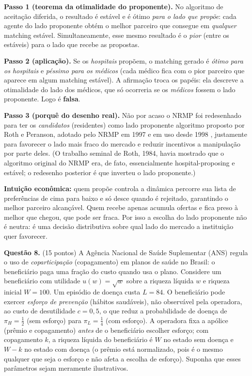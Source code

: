 \begin{solucao}
\textbf{Passo 1 (teorema da otimalidade do proponente).} No algoritmo de aceita\c{c}\~ao diferida, o resultado \'e est\'avel e \'e \'otimo \emph{para o lado que prop\~oe}: cada agente do lado proponente obt\'em o melhor parceiro que consegue em \emph{qualquer} matching est\'avel. Simultaneamente, esse mesmo resultado \'e o \emph{pior} (entre os est\'aveis) para o lado que recebe as propostas.

\textbf{Passo 2 (aplica\c{c}\~ao).} Se os \emph{hospitais} prop\~oem, o matching gerado \'e \emph{\'otimo para os hospitais} e \emph{p\'essimo para os m\'edicos} (cada m\'edico fica com o pior parceiro que aparece em algum matching est\'avel). A afirma\c{c}\~ao troca os pap\'eis: ela descreve a otimalidade do lado dos m\'edicos, que s\'o ocorreria se os \emph{m\'edicos} fossem o lado proponente. Logo \'e \textbf{falsa}.

\textbf{Passo 3 (porqu\^e do desenho real).} N\~ao por acaso o NRMP foi redesenhado para ter os \emph{candidatos} (residentes) como lado proponente \textemdash{} algoritmo proposto por Roth e Peranson, adotado pelo NRMP em 1997 e em uso desde 1998 \textemdash{}, justamente para favorecer o lado mais fraco do mercado e reduzir incentivos a manipula\c{c}\~ao por parte deles. (O trabalho seminal de Roth, 1984, havia mostrado que o algoritmo original do NRMP era, de fato, essencialmente hospital-proposing e est\'avel; o redesenho posterior \'e que inverteu o lado proponente.)

\textbf{Intui\c{c}\~ao econ\^omica:} quem prop\~oe controla a din\^amica \textemdash{} percorre sua lista de prefer\^encias de cima para baixo e s\'o desce quando \'e rejeitado, garantindo o melhor parceiro alcan\c{c}\'avel. Quem recebe apenas acumula ofertas e fica preso \`a melhor que chegou, que pode ser fraca. Por isso a escolha do lado proponente n\~ao \'e neutra: \'e uma decis\~ao distributiva sobre qual lado do mercado a institui\c{c}\~ao quer favorecer.
\end{solucao}


\textbf{Questão 8.} (15 pontos) A Ag\^encia Nacional de Sa\'ude Suplementar (ANS) regula o uso de \emph{coparticipa\c{c}\~ao} (copagamento) em planos de sa\'ude no Brasil: o benefici\'ario paga uma fra\c{c}\~ao do custo quando usa o plano. Considere um benefici\'ario com utilidade $u(w)=\sqrt{w}$ sobre a riqueza l\'iquida $w$ e riqueza inicial $W=100$. Um epis\'odio de doen\c{c}a custa $L=84$. O benefici\'ario pode exercer \emph{esfor\c{c}o de preven\c{c}\~ao} (h\'abitos saud\'aveis), n\~ao observ\'avel pela operadora, ao custo de desutilidade $c=0{,}5$, o que reduz a probabilidade de doen\c{c}a de $\pi_H = \tfrac{1}{2}$ (sem esfor\c{c}o) para $\pi_L = \tfrac{1}{4}$ (com esfor\c{c}o). A operadora fixa a ap\'olice (pr\^emio e copagamento) \emph{antes} de o benefici\'ario escolher esfor\c{c}o; com copagamento $k$, a riqueza l\'iquida do benefici\'ario \'e $W$ no estado sem doen\c{c}a e $W-k$ no estado com doen\c{c}a (o pr\^emio est\'a normalizado, pois \'e o mesmo qualquer que seja o esfor\c{c}o e n\~ao afeta a escolha de esfor\c{c}o). Suponha que esses par\^ametros sejam meramente ilustrativos.

